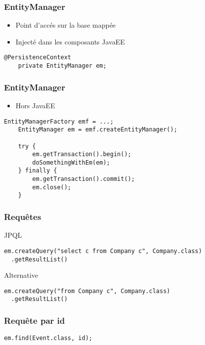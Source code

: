 \documentclass[t,12pt]{beamer}
\begin{document}
\begin{frame}[fragile]
	\frametitle{EntityManager}

	\begin{itemize}
		\item Point d'acc\'es sur la base mapp\'ee
		\item Inject\'e dans les composants JavaEE
	\end{itemize}

	\begin{lstlisting}[frame=none]
    @PersistenceContext
    private EntityManager em;
	\end{lstlisting}
\end{frame}

\begin{frame}[fragile]
	\frametitle{EntityManager}

	\begin{itemize}
		\item Hors JavaEE
	\end{itemize}

	\begin{lstlisting}[frame=none]
    EntityManagerFactory emf = ...;
    EntityManager em = emf.createEntityManager();

    try {
        em.getTransaction().begin();
        doSomethingWithEm(em);
    } finally {
        em.getTransaction().commit();
        em.close();
    }
	\end{lstlisting}
\end{frame}

\begin{frame}[fragile]
	\frametitle{Requ\^etes}

	\begin{block}{JPQL}
		\begin{lstlisting}[frame=none]
em.createQuery("select c from Company c", Company.class)
  .getResultList()
		\end{lstlisting}
	\end{block}

	\begin{exampleblock}{Alternative}
		\begin{lstlisting}[frame=none]
em.createQuery("from Company c", Company.class)
  .getResultList()
		\end{lstlisting}
	\end{exampleblock}
\end{frame}

\begin{frame}[fragile]
	\frametitle{Requ\^ete par id}

	\begin{lstlisting}[frame=none]
    em.find(Event.class, id);
	\end{lstlisting}
\end{frame}
\end{document}
